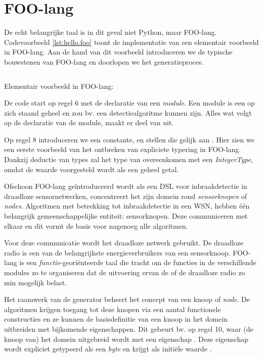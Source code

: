 
\section{FOO-lang}
\label{section:devel-foo-lang}

De echt belangrijke taal is in dit geval niet Python, maar FOO-lang.
Codevoorbeeld \ref{lst:hello.foo} toont de implementatie van een elementair
voorbeeld in FOO-lang. Aan de hand van dit voorbeeld introduceren we de
typische bouwstenen van FOO-lang en doorlopen we het generatieproces.

\begin{listing}[ht]
  \inputminted[linenos,frame=lines,framesep=2mm,fontsize=\footnotesize]{js}{../src/foo-lang/examples/hello.foo}
  \vspace{-3mm}
  \caption{Elementair voorbeeld in FOO-lang: }
  \label{lst:hello.foo}
\end{listing}

De code start op regel 6 met de declaratie van een \emph{module}. Een module is
een op zich staand geheel en zou bv. een detectiealgoritme kunnen zijn. Alles
wat volgt op de declaratie van de module, maakt er deel van uit.

Op regel 8 introduceren we een constante,  en stellen die gelijk
aan . Hier zien we een eerste voorbeeld van het ontbreken van
expliciete typering in FOO-lang. Dankzij deductie van types zal het type van
 overeenkomen met een \emph{IntegerType}, omdat de waarde
 voorgesteld wordt als een geheel getal.

Ofschoon FOO-lang ge\"introduceerd wordt als een DSL voor inbraakdetectie in
draadloze sensornetwerken, concentreert het zijn domein rond
\emph{sensorknopen} of \emph{nodes}. Algoritmen met betrekking tot
inbraakdetectie in een WSN, hebben \'e\'en belangrijk gemeenschappelijke
entiteit: sensorknopen. Deze communiceren met elkaar en dit vormt de basis voor
nagenoeg alle algoritmen.

Voor deze communicatie wordt het draadloze netwerk gebruikt. De draadloze radio
is een van de belangrijkste energieverbruikers van een sensorknoop. FOO-lang is
een \emph{functie}-geori\"enteerde taal die tracht om de functies in de
verschillende modules zo te organiseren dat de uitvoering ervan de \mcu of de
draadloze radio zo min mogelijk belast.

Het raamwerk van de generator beheert het concept van een knoop of \emph{node}.
De algoritmen krijgen toegang tot deze knopen via een aantal functionele
constructies en ze kunnen de basisdefinitie van een knoop in het domein
uitbreiden met bijkomende eigenschappen. Dit gebeurt bv. op regel 10, waar (de
knoop van) het domein uitgebreid wordt met een eigenschap . Deze
eigenschap wordt expliciet getypeerd als een \emph{byte} en krijgt als
initi\"ele waarde .

